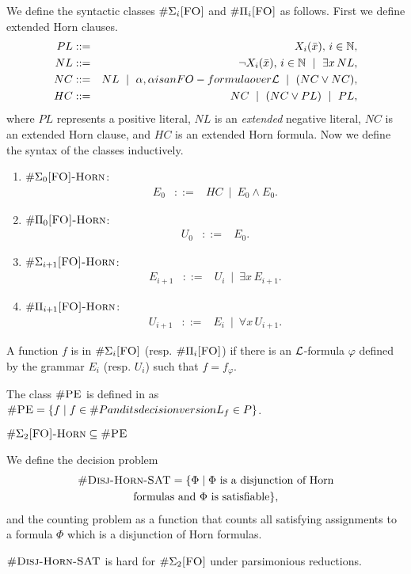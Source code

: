 We define the syntactic classes $\#\Sigma_{i}\textsc{[FO]}$ and $\#\Pi_{i}\textsc{[FO]}$ as follows. First we define extended Horn clauses.
\begin{eqnarray*}
	PL &::=& X_i(\x),\, i\in\N,\\
	NL &::=& \neg X_i(\x),\, i\in\N \ \mid \ \exists x\, NL,\\
	NC &::=& NL \ \mid \ \alpha, \alpha \mbox{ is an {\sc FO}-formula over } \L \ \mid \ (NC \vee NC),\\
	HC &::=& NC \ \mid \ (NC \vee PL) \ \mid \ PL,
\end{eqnarray*}
where $PL$ represents a positive literal, $NL$ is an \textit{extended} negative literal, $NC$ is an extended Horn clause, and $HC$ is an extended Horn formula. Now we define the syntax of the classes inductively.\textbf{}
\begin{enumerate}
	\item $\#\Sigma_{0}\textsc{[FO]-Horn}$:
	\begin{eqnarray*}
		E_0 &::=& HC \ \mid \ E_0 \wedge E_0.
	\end{eqnarray*}
	\item $\#\Pi_{0}\textsc{[FO]-Horn}$:
	\begin{eqnarray*}
		U_0 &::=& E_0.
	\end{eqnarray*}
	\item $\#\Sigma_{i+1}\textsc{[FO]-Horn}$:
	\begin{eqnarray*}
		E_{i+1} &::=& U_i \ \mid \ \exists x \, E_{i+1}.
	\end{eqnarray*}
	\item $\#\Pi_{i+1}\textsc{[FO]-Horn}$:
	\begin{eqnarray*}
		U_{i+1} &::=& E_i \ \mid \ \forall x \, U_{i+1}.
	\end{eqnarray*}
\end{enumerate}
A function $f$ is in $\#\Sigma_{i}\textsc{[FO]}$ (resp. $\#\Pi_{i}\textsc{[FO]}$) if there is an $\L$-formula $\varphi$ defined by the grammar $E_i$ (resp. $U_i$) such that $f = f_{\varphi}$.

The class $\text{\sc \#PE}$ is defined in \cite{DBLP:conf/mfcs/PagourtzisZ06} as $\text{\sc \#PE} = \{f\mid f\in\#P \relax{ and its decision version } L_{f}\in P\}$.

\begin{theorem}
	$\#\Sigma_{2}\textsc{[FO]-Horn} \subseteq \text{\sc \#PE}$
\end{theorem}

We define the decision problem
\begin{multline*}
\textsc{\#Disj-Horn-SAT} = \{\Phi \mid \Phi \text{ is a disjunction of Horn} \\ \text{formulas and $\Phi$ is satisfiable}\},
\end{multline*}
and the counting problem {\shdhsat } as a function that counts all satisfying assignments to a formula $\Phi$ which is a disjunction of Horn formulas.

\begin{theorem} \label{sigma2hard}
	$\textsc{\#Disj-Horn-SAT}$ is hard for $\#\Sigma_{2}\textsc{[FO]}$ under parsimonious reductions. 
\end{theorem}




